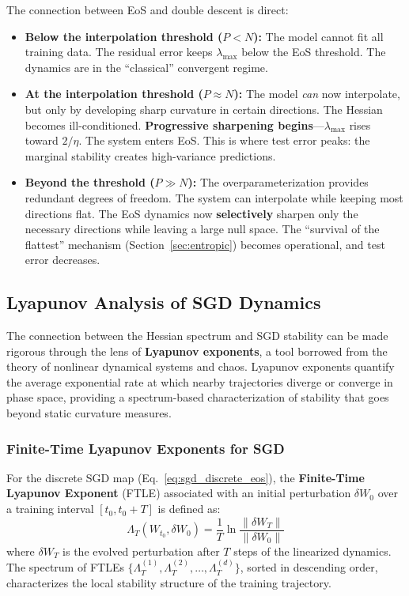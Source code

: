 \documentclass[
  journal=largetwo,
  simfonts=false,
  year=2025,
  volume=37,
]{cup-journal}
\begin{document}
The connection between EoS and double descent is direct:
\begin{itemize}
    \item \textbf{Below the interpolation threshold ($P < N$):} The model cannot fit all training data. The residual error keeps $\lambda_{\max}$ below the EoS threshold. The dynamics are in the ``classical'' convergent regime.
    \item \textbf{At the interpolation threshold ($P \approx N$):} The model \textit{can} now interpolate, but only by developing sharp curvature in certain directions. The Hessian becomes ill-conditioned. \textbf{Progressive sharpening begins}---$\lambda_{\max}$ rises toward $2/\eta$. The system enters EoS. This is where test error peaks: the marginal stability creates high-variance predictions.
    \item \textbf{Beyond the threshold ($P \gg N$):} The overparameterization provides redundant degrees of freedom. The system can interpolate while keeping most directions flat. The EoS dynamics now \textbf{selectively} sharpen only the necessary directions while leaving a large null space. The ``survival of the flattest'' mechanism (Section~\ref{sec:entropic}) becomes operational, and test error decreases.
\end{itemize}

\subsection{Lyapunov Analysis of SGD Dynamics}\label{sec:lyapunov}

The connection between the Hessian spectrum and SGD stability can be made rigorous through the lens of \textbf{Lyapunov exponents}, a tool borrowed from the theory of nonlinear dynamical systems and chaos. Lyapunov exponents quantify the average exponential rate at which nearby trajectories diverge or converge in phase space, providing a spectrum-based characterization of stability that goes beyond static curvature measures.

\subsubsection{Finite-Time Lyapunov Exponents for SGD}

For the discrete SGD map (Eq.~\ref{eq:sgd_discrete_eos}), the \textbf{Finite-Time Lyapunov Exponent} (FTLE) associated with an initial perturbation $\delta W_0$ over a training interval $[t_0, t_0 + T]$ is defined as:
\begin{equation}\label{eq:ftle_def}
    \Lambda_T(W_{t_0}, \delta W_0) = \frac{1}{T} \ln \frac{\|\delta W_T\|}{\|\delta W_0\|}
\end{equation}
where $\delta W_T$ is the evolved perturbation after $T$ steps of the linearized dynamics. The spectrum of FTLEs $\{\Lambda_T^{(1)}, \Lambda_T^{(2)}, \ldots, \Lambda_T^{(d)}\}$, sorted in descending order, characterizes the local stability structure of the training trajectory.
\end{document}

